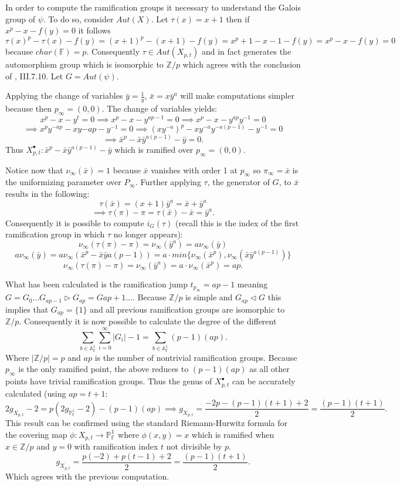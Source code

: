 \documentclass[paper=a4, fontsize=11pt]{scrartcl} %
\numberwithin{equation}{section} %
\numberwithin{figure}{section} %
\numberwithin{table}{section} %
\theoremstyle{break}
\begin{document}
In order to compute the ramification groups it necessary to understand the Galois group of $\psi$. To do so, consider $Aut(X)$. Let $\tau(x)=x+1$ then if $x^p - x - f(y) = 0$ it follows
$$
\tau(x)^p - \tau(x) - f(y) = (x+1)^p - (x+1) - f(y) = x^p + 1 - x - 1 - f(y) = x^p-x-f(y) = 0
$$
because $char(\mathbb{F})=p$. Consequently $\tau\in Aut(X_{p,t})$ and in fact generates the automorphism group which is isomorphic to $\mathbb{Z}/p$ which agrees with the conclusion of \cite{stitchenoth}, III.7.10. Let $G=Aut(\psi)$.

Applying the change of variables $\bar{y}=\frac{1}{y}$, $\bar{x}=x\bar{y}^a$ will make computations simpler because then $p_\infty = (0,0)$. The change of variables yields:
$$x^p-x-y^t = 0 \implies x^p-x-y^{ap-1}=0 \implies x^p-x-y^{ap}y^{-1}=0 $$
$$\implies x^p y^{-ap} -xy{-ap}-y^{-1}=0 \implies (xy^{-a})^p - xy^{-a}y^{-a(p-1)}-y^{-1}=0 $$
$$\implies \bar{x}^p-\bar{x}\bar{y}^{a(p-1)}-\bar{y} = 0.$$
Thus $X^{\bullet}_{p,t}: \bar{x}^p-\bar{x}\bar{y}^{a(p-1)}-\bar{y}$ which is ramified over $p_\infty = (0,0)$.

Notice now that $\nu_\infty(\bar{x}) = 1$ because $\bar{x}$ vanishes with order 1 at $p_\infty$ so $\pi_\infty = \bar{x}$ is the uniformizing parameter over $P_\infty$. Further applying $\tau$, the generator of $G$, to $\bar{x}$ results in the following:
$$\tau(\bar{x}) = (x+1)\bar{y}^a = \bar{x} + \bar{y}^a$$
$$\implies \tau(\pi)-\pi =  \tau(\bar{x}) - \bar{x} = \bar{y}^a.$$
Consequently it is possible to compute $i_G(\tau)$ (recall this is the index of the first ramification group in which $\tau$ no longer appears):
$$\nu_\infty(\tau(\pi)-\pi) = \nu_\infty(\bar{y}^a)=a\nu_\infty(\bar{y})$$
$$a\nu_\infty(\bar{y})=a\nu_\infty(\bar{x}^p - \bar{x}\bar{y}{a(p-1)})=a\cdot min\{\nu_\infty(\bar{x}^p),\nu_\infty(\bar{x}\bar{y}^{a(p-1)})\}$$
$$\nu_\infty(\tau(\pi)-\pi) = \nu_\infty(\bar{y}^a) = a\cdot\nu_\infty(\bar{x}^p)=ap.$$

What has been calculated is the ramification jump $t_{p_\infty} = ap-1$ meaning $G = G_0 \ldots G_{ap-1} \triangleright G_{ap} = G{ap+1}\ldots$. Because $\mathbb{Z}/p$ is simple and $G_{ap} \triangleleft G$ this implies that $G_{ap} = \{1\}$ and all previous ramification groups are isomorphic to $\mathbb{Z}/p$. Consequently it is now possible to calculate the degree of the different
$$
\sum_{b\in\mathbb{A}^1_\mathbb{F}} \sum_{i=0}^\infty |G_i| - 1 = \sum_{b\in\mathbb{A}^1_\mathbb{F}} (p-1)(ap).
$$
Where $|\mathbb{Z}/p|=p$ and $ap$ is the number of nontrivial ramification groups. Because $p_\infty$ is the only ramified point, the above reduces to $(p-1)(ap)$ as all other points have trivial ramification groups. Thus the genus of $X^\bullet_{p,t}$ can be accurately calculated (using $ap=t+1$:
$$
2g_{X_{p,t}} -2= p(2g_{\mathbb{P}^1_{\mathbb{F}}} -2) - (p-1)(ap) \implies  g_{X_{p,t}} = \frac{-2p-(p-1)(t+1)+2}{2}=\frac{(p-1)(t+1)}{2}.
$$
This result can be confirmed using the standard Riemann-Hurwitz formula for the covering map $\phi:X_{p,t} \to \mathbb{P}_\mathbb{F}^1$ where $\phi(x,y)=x$ which is ramified when $x\in \mathbb{Z}/p$ and $y=0$ with ramification index $t$ not divisible by $p$.
$$
g_{X_{p,t}} = \frac{p(-2) + p(t-1) +2}{2} = \frac{(p-1)(t+1)}{2}.
$$
Which agrees with the previous computation.
\clearpage
\printbibliography
\end{document}
